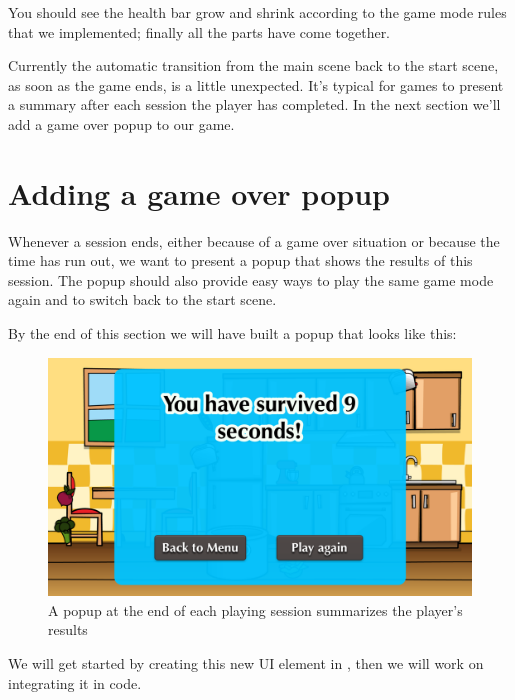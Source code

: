 You should see the health bar grow and shrink according to the game mode
rules that we implemented; finally all the parts have come together.

Currently the automatic transition from the main scene back to the start scene,
as soon as the game ends, is a little unexpected. It's typical for games to
present a summary after each session the player has completed. In the next section we'll add a game over
popup to our game.

\section{Adding a game over popup}
Whenever a session ends, either because of a game over situation or because the
time has run out, we want to present a popup that shows the results of this
session. The popup should also provide easy ways to play the same game mode
again and to switch back to the start scene.

By the end of this section we will have built a popup that looks like this:
\begin{figure}[H]
    \centering
    \includegraphics[width=0.5\linewidth]{images/Chapter7/game_over_popup.png}
    \caption{A popup at the end of each playing session summarizes the player's
    results}\label{fig: gameover_popup}
\end{figure}

We will get started by creating this new UI element in \SB{}, then we will work
on integrating it in code.

